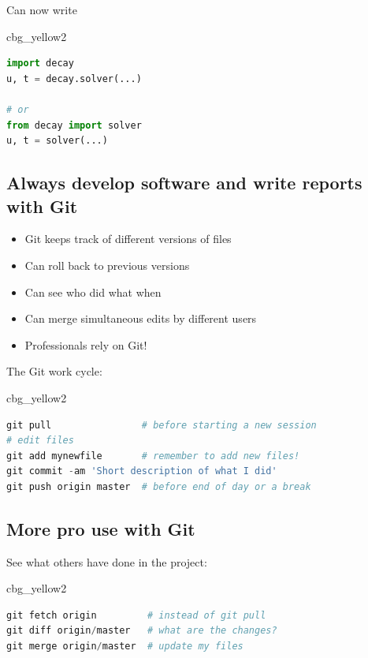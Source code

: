 \documentclass[%
oneside,                 %
final,                   %
10pt]{article}
\newenvironment{_cod_tight}[1]{
   \def\FrameCommand{\colorbox{#1}}
   \FrameRule0.6pt\MakeFramed {\FrameRestore}\vskip3mm}
   {\vskip0mm\endMakeFramed}
\newenvironment{cod}[1]{
\bgroup\rmfamily
\fboxsep=0mm\relax
\begin{_cod_tight}{#1}
\list{}{\parsep=-2mm\parskip=0mm\topsep=0pt\leftmargin=2mm
\rightmargin=2\leftmargin\leftmargin=4pt\relax}
\item\relax}
{\endlist\end{_cod_tight}\egroup}
\begin{document}
Can now write

\begin{cod}{cbg_yellow2}\begin{lstlisting}[language=Python,style=simple,xleftmargin=2mm]
import decay
u, t = decay.solver(...)

# or
from decay import solver
u, t = solver(...)
\end{lstlisting}\end{cod}
\noindent

\subsection*{Always develop software and write reports with Git}

\begin{itemize}
 \item Git keeps track of different versions of files

 \item Can roll back to previous versions

 \item Can see who did what when

 \item Can merge simultaneous edits by different users

 \item Professionals rely on Git!
\end{itemize}

\noindent
The Git work cycle:

\begin{cod}{cbg_yellow2}\begin{lstlisting}[language=Python,style=simple,xleftmargin=2mm]
git pull                # before starting a new session
# edit files
git add mynewfile       # remember to add new files!
git commit -am 'Short description of what I did'
git push origin master  # before end of day or a break
\end{lstlisting}\end{cod}
\noindent

\subsection*{More pro use with Git}

See what others have done in the project:

\begin{cod}{cbg_yellow2}\begin{lstlisting}[language=Python,style=simple,xleftmargin=2mm]
git fetch origin         # instead of git pull
git diff origin/master   # what are the changes?
git merge origin/master  # update my files
\end{lstlisting}\end{cod}
\noindent
\end{document}
